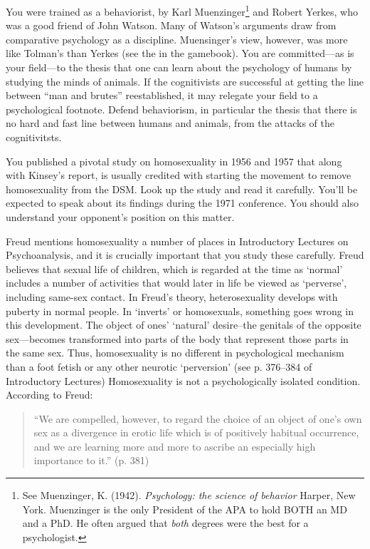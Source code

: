\begin{refsection}
You were trained as a behaviorist, by Karl Muenzinger\footnote{See Muenzinger, K. (1942). \emph{Psychology: the science of behavior} Harper, New York. Muenzinger is the only President of the APA to hold BOTH an MD and a PhD. He often argued that \emph{both} degrees were the best for a psychologist.} and Robert Yerkes, who was a good friend of John Watson. Many of Watson's arguments draw from comparative psychology as a discipline. Muensinger's view, however, was more like Tolman's than Yerkes (see the  in the gamebook). You are committed---as is your field---to the thesis that one can learn about the psychology of humans by studying the minds of animals. If the cognitivists are successful at getting the line between ``man and brutes'' reestablished, it may relegate your field to a psychological footnote. Defend behaviorism, in particular the thesis that there is no hard and fast line between humans and animals, from the attacks of the cognitivitsts.

You published a pivotal study on homosexuality in 1956 and 1957 that along with Kinsey's report, is usually credited with starting the movement to remove homosexuality from the DSM. Look up the study and read it carefully. You'll be expected to speak about its findings during the 1971 conference. You should also understand your opponent's position on this matter.

Freud mentions homosexuality a number of places in Introductory Lectures on Psychoanalysis, and it is crucially important that you study these carefully. Freud believes that sexual life of children, which is regarded at the time as `normal' includes a number of activities that would later in life be viewed as `perverse', including same-sex contact. In Freud's theory, heterosexuality develops with puberty in normal people. In `inverts' or homosexuals, something goes wrong in this development. The object of ones' `natural' desire--the genitals of the opposite sex---becomes transformed into parts of the body that represent those parts in the same sex. Thus, homosexuality is no different in psychological mechanism than a foot fetish or any other neurotic `perversion' (see p. 376--384 of Introductory Lectures) Homosexuality is not a psychologically isolated condition. According to Freud:

\begin{quote}

``We are compelled, however, to regard the choice of an object of one's own sex as a divergence in erotic life which is of positively habitual occurrence, and we are learning more and more to ascribe an especially high importance to it.'' (p. 381)
\end{quote}


\end{refsection}
